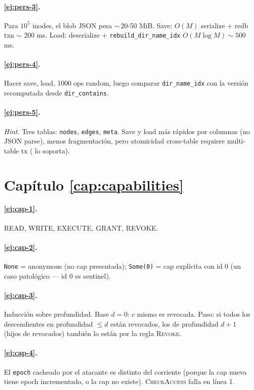 \paragraph{\ref{ej:pers-3}.} Para \(10^5\) inodes, el blob JSON pesa
${\sim}\,20$-50 MiB. Save: $O(M)$ serialize + redb txn $\sim$ 200 ms.
Load: deserialize + \texttt{rebuild\_dir\_name\_idx} $O(M \log M) \sim
500$ ms.

\paragraph{\ref{ej:pers-4}.} Hacer save, load, 1000 ops random,
luego comparar \texttt{dir\_name\_idx} con la versión recomputada
desde \texttt{dir\_contains}.

\paragraph{\ref{ej:pers-5}.} \emph{Hint.} Tres tablas: \texttt{nodes},
\texttt{edges}, \texttt{meta}. Save y load más rápidos por columnas
(no JSON parse), menos fragmentación, pero atomicidad cross-table
requiere multi-table tx (\redb{} lo soporta).

\section*{Capítulo \ref{cap:capabilities}}

\paragraph{\ref{ej:cap-1}.} READ, WRITE, EXECUTE, GRANT, REVOKE.

\paragraph{\ref{ej:cap-2}.} \texttt{None} = anonymous (no cap
presentada); \texttt{Some(0)} = cap explícita con id 0 (un caso
patológico — id 0 es sentinel).

\paragraph{\ref{ej:cap-3}.} Inducción sobre profundidad. Base
$d=0$: $c$ mismo es revocada. Paso: si todos los descendientes en
profundidad $\leq d$ están revocados, los de profundidad $d+1$ (hijos
de revocados) también lo están por la regla \textsc{Revoke}.

\paragraph{\ref{ej:cap-4}.} El \texttt{epoch} cacheado por el atacante
es distinto del corriente (porque la cap nueva tiene epoch
incrementado, o la cap no existe). \textsc{CheckAccess} falla en línea
1.

